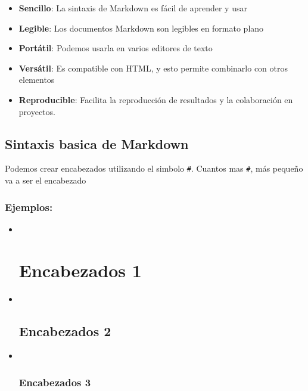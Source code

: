 \documentclass[
]{book}
\providecommand{\tightlist}{%
  \setlength{\itemsep}{0pt}\setlength{\parskip}{0pt}}
\theoremstyle{definition}
\theoremstyle{definition}
\theoremstyle{definition}
\theoremstyle{definition}
\theoremstyle{remark}
\begin{document}
\begin{itemize}
\tightlist
\item
  \textbf{Sencillo}: La sintaxis de Markdown es fácil de aprender y usar
\item
  \textbf{Legible}: Los documentos Markdown son legibles en formato plano
\item
  \textbf{Portátil}: Podemos usarla en varios editores de texto
\item
  \textbf{Versátil}: Es compatible con HTML, y esto permite combinarlo con otros elementos
\item
  \textbf{Reproducible}: Facilita la reproducción de resultados y la colaboración en proyectos.
\end{itemize}

\hypertarget{sintaxis-basica-de-markdown}{%
\section*{Sintaxis basica de Markdown}\label{sintaxis-basica-de-markdown}}

Podemos crear encabezados utilizando el simbolo \texttt{\#}. Cuantos mas \texttt{\#}, más pequeño va a ser el encabezado

\hypertarget{ejemplos}{%
\subsection*{Ejemplos:}\label{ejemplos}}

\begin{itemize}
\item ~
  \hypertarget{encabezados-1}{%
  \chapter{Encabezados 1}\label{encabezados-1}}
\item ~
  \hypertarget{encabezados-2}{%
  \section{Encabezados 2}\label{encabezados-2}}
\item ~
  \hypertarget{encabezados-3}{%
  \subsection{Encabezados 3}\label{encabezados-3}}
\end{itemize}
\end{document}
